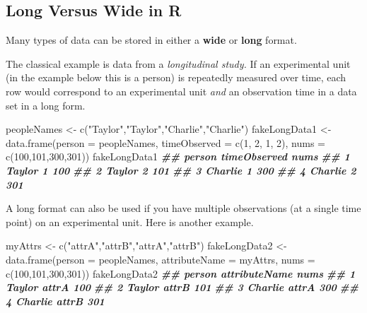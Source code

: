 \documentclass[
  12pt,
  krantz2]{krantz}
\makeatletter
\newenvironment{Shaded}{\begin{snugshade}}{\end{snugshade}}
\newcommand{\AttributeTok}[1]{\textcolor[rgb]{0.61,0.61,0.61}{#1}}
\newcommand{\DecValTok}[1]{\textcolor[rgb]{0.06,0.06,0.06}{#1}}
\newcommand{\DocumentationTok}[1]{\textcolor[rgb]{0.37,0.37,0.37}{\textbf{\textit{#1}}}}
\newcommand{\FunctionTok}[1]{\textcolor[rgb]{0,0,0}{#1}}
\newcommand{\NormalTok}[1]{#1}
\newcommand{\OtherTok}[1]{\textcolor[rgb]{0.37,0.37,0.37}{#1}}
\newcommand{\StringTok}[1]{\textcolor[rgb]{0.5,0.5,0.5}{#1}}
\newenvironment{kframe}{%
\medskip{}
\setlength{\fboxsep}{.8em}
 \def\at@end@of@kframe{}%
 \ifinner\ifhmode%
  \def\at@end@of@kframe{\end{minipage}}%
  \begin{minipage}{\columnwidth}%
 \fi\fi%
 \def\FrameCommand##1{\hskip\@totalleftmargin \hskip-\fboxsep
 \colorbox{shadecolor}{##1}\hskip-\fboxsep
     \hskip-\linewidth \hskip-\@totalleftmargin \hskip\columnwidth}%
 \MakeFramed {\advance\hsize-\width
   \@totalleftmargin\z@ \linewidth\hsize
   \@setminipage}}%
 {\par\unskip\endMakeFramed%
 \at@end@of@kframe}
\renewenvironment{Shaded}{\begin{kframe}}{\end{kframe}}
\makeatother
\begin{document}
\hypertarget{long-versus-wide-in-r}{%
\subsection{Long Versus Wide in R}\label{long-versus-wide-in-r}}

Many types of data can be stored in either a \textbf{wide} or \textbf{long} format.

The classical example is data from a \emph{longitudinal study.} If an experimental unit (in the example below this is a person) is repeatedly measured over time, each row would correspond to an experimental unit \emph{and} an observation time in a data set in a long form.

\begin{Shaded}
\begin{Highlighting}[]
\NormalTok{peopleNames }\OtherTok{\textless{}{-}} \FunctionTok{c}\NormalTok{(}\StringTok{"Taylor"}\NormalTok{,}\StringTok{"Taylor"}\NormalTok{,}\StringTok{"Charlie"}\NormalTok{,}\StringTok{"Charlie"}\NormalTok{)}
\NormalTok{fakeLongData1 }\OtherTok{\textless{}{-}} \FunctionTok{data.frame}\NormalTok{(}\AttributeTok{person =}\NormalTok{ peopleNames, }
                             \AttributeTok{timeObserved =} \FunctionTok{c}\NormalTok{(}\DecValTok{1}\NormalTok{, }\DecValTok{2}\NormalTok{, }\DecValTok{1}\NormalTok{, }\DecValTok{2}\NormalTok{),}
                             \AttributeTok{nums =} \FunctionTok{c}\NormalTok{(}\DecValTok{100}\NormalTok{,}\DecValTok{101}\NormalTok{,}\DecValTok{300}\NormalTok{,}\DecValTok{301}\NormalTok{))}
\NormalTok{fakeLongData1}
\DocumentationTok{\#\#    person timeObserved nums}
\DocumentationTok{\#\# 1  Taylor            1  100}
\DocumentationTok{\#\# 2  Taylor            2  101}
\DocumentationTok{\#\# 3 Charlie            1  300}
\DocumentationTok{\#\# 4 Charlie            2  301}
\end{Highlighting}
\end{Shaded}

A long format can also be used if you have multiple observations (at a single time point) on an experimental unit. Here is another example.

\begin{Shaded}
\begin{Highlighting}[]
\NormalTok{myAttrs }\OtherTok{\textless{}{-}} \FunctionTok{c}\NormalTok{(}\StringTok{"attrA"}\NormalTok{,}\StringTok{"attrB"}\NormalTok{,}\StringTok{"attrA"}\NormalTok{,}\StringTok{"attrB"}\NormalTok{)}
\NormalTok{fakeLongData2 }\OtherTok{\textless{}{-}} \FunctionTok{data.frame}\NormalTok{(}\AttributeTok{person =}\NormalTok{ peopleNames, }
                             \AttributeTok{attributeName =}\NormalTok{ myAttrs,}
                             \AttributeTok{nums =} \FunctionTok{c}\NormalTok{(}\DecValTok{100}\NormalTok{,}\DecValTok{101}\NormalTok{,}\DecValTok{300}\NormalTok{,}\DecValTok{301}\NormalTok{))}
\NormalTok{fakeLongData2}
\DocumentationTok{\#\#    person attributeName nums}
\DocumentationTok{\#\# 1  Taylor         attrA  100}
\DocumentationTok{\#\# 2  Taylor         attrB  101}
\DocumentationTok{\#\# 3 Charlie         attrA  300}
\DocumentationTok{\#\# 4 Charlie         attrB  301}
\end{Highlighting}
\end{Shaded}
\end{document}
